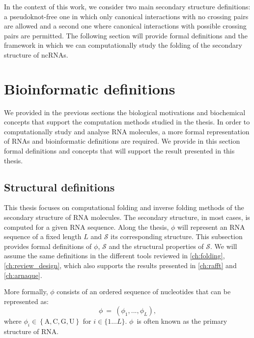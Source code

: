 In the context of this work, we consider two main secondary structure definitions: a pseudoknot-free one in which only canonical interactions with no crossing pairs are allowed and a second one where canonical interactions with possible crossing pairs are permitted. The following section will provide formal definitions and the framework in which we can computationally study the folding of the secondary structure of \acp{ncRNA}.




\section{Bioinformatic definitions}
\label{sec:definitions}
We provided in the previous sections the biological motivations and biochemical concepts that support the computation methods studied in the thesis. In order to computationally study and analyse \ac{RNA} molecules, a more formal representation of \acp{RNA} and bioinformatic definitions are required. We provide in this section formal definitions and concepts that will support the result presented in this thesis.

\subsection{Structural definitions}
\label{subsec:structural_definitions}
This thesis focuses on computational folding and inverse folding methods of the secondary structure of \ac{RNA} molecules. The secondary structure, in most cases, is computed for a given \ac{RNA} sequence. Along the thesis, $\phi$ will represent an \ac{RNA} sequence of a fixed length $L$ and $\mathcal{S}$ its corresponding structure. This subsection provides formal definitions of $\phi$, $\mathcal{S}$ and the structural properties of $\mathcal{S}$. We will assume the same definitions in the different tools reviewed in  \autoref{ch:folding}, \autoref{ch:review_design}, which also supports the  results presented in \autoref{ch:rafft} and \autoref{ch:arnaque}.

\begin{mydef}
	\label{def:rna_sequence}
	More formally, $\phi$ consists of an ordered sequence of nucleotides that can be represented as:~ \begin{equation}
	\phi\ =\ \left(\phi_1,...,\phi_L\right),
	\end{equation}
	where $\phi_i\in\left\{\text{A},\text{C},\text{G},\text{U}\right\}$ for $i\in \{1\dots L\}$.
	\(\phi\)~is often known as the primary structure of \ac{RNA}.
\end{mydef}

